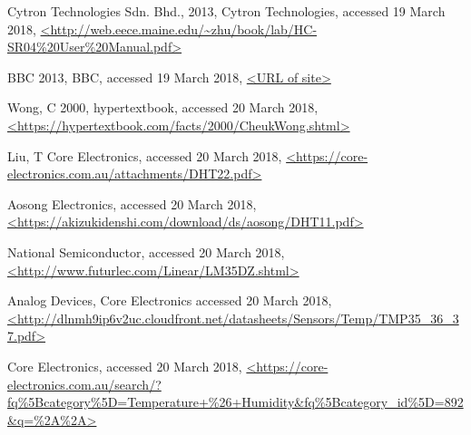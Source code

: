 \documentclass[11pt]{article}
\begin{document}
					
		\newpage
			\begin{thebibliography}{}
				Cytron Technologies Sdn. Bhd., 2013, Cytron Technologies, accessed 19 March 2018, \url{<http://web.eece.maine.edu/~zhu/book/lab/HC-SR04%20User%20Manual.pdf>}
					
				BBC 2013, BBC, accessed 19 March 2018, \url{<URL of site>}
				
				Wong, C 2000, hypertextbook, accessed 20 March 2018, \url{<https://hypertextbook.com/facts/2000/CheukWong.shtml>}
				
				Liu, T Core Electronics, accessed 20 March 2018, \url{<https://core-electronics.com.au/attachments/DHT22.pdf>}
				
				Aosong Electronics, accessed 20 March 2018, \url{<https://akizukidenshi.com/download/ds/aosong/DHT11.pdf>}
				
				National Semiconductor, accessed 20 March 2018, \url{<http://www.futurlec.com/Linear/LM35DZ.shtml>}
				
				Analog Devices, Core Electronics accessed 20 March 2018, \url{<http://dlnmh9ip6v2uc.cloudfront.net/datasheets/Sensors/Temp/TMP35_36_37.pdf>}
				
				Core Electronics, accessed 20 March 2018, \url{<https://core-electronics.com.au/search/?fq%5Bcategory%5D=Temperature+%26+Humidity&fq%5Bcategory_id%5D=892&q=%2A%2A>}
				
				
				
				
				
				
				
				
			\end{thebibliography}
			
		
	
\end{document}

